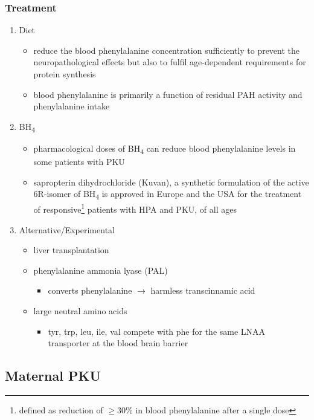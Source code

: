 \documentclass[12pt]{scrartcl}
\begin{document}
\subsubsection{Treatment}
\label{sec:orgf3ce635}
\begin{enumerate}
\item Diet
\label{sec:org19fcb8a}
\begin{itemize}
\item reduce the blood phenylalanine concentration sufficiently to prevent the
neuropathological effects but also to fulfil age-dependent
requirements for protein synthesis
\item blood phenylalanine is primarily a function of residual PAH activity and phenylalanine
intake
\end{itemize}
\item BH\textsubscript{4}
\label{sec:orgaaaf946}
\begin{itemize}
\item pharmacological doses of BH\textsubscript{4} can reduce blood phenylalanine levels
in some patients with PKU
\item sapropterin dihydrochloride (Kuvan), a synthetic formulation of the
active 6R-isomer of BH\textsubscript{4} is approved in Europe and the USA for the
treatment of responsive\footnote{defined as reduction of \(\ge\)30\% in blood phenylalanine after a
single dose} patients with HPA and PKU, of all
ages
\end{itemize}
\item Alternative/Experimental
\label{sec:orga2711f3}
\begin{itemize}
\item liver transplantation
\item phenylalanine ammonia lyase (PAL)
\begin{itemize}
\item converts phenylalanine \(\to\) harmless transcinnamic acid
\end{itemize}
\item large neutral amino acids
\begin{itemize}
\item tyr, trp, leu, ile, val compete with phe for the same LNAA transporter at
the blood brain barrier
\end{itemize}
\end{itemize}
\end{enumerate}

\subsection{Maternal PKU}
\label{sec:orgbf9ca33}
\end{document}
